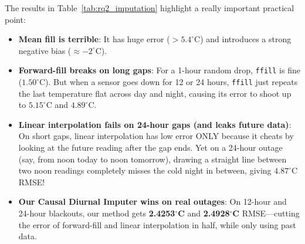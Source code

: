 \documentclass[conference]{IEEEtran}
\begin{document}
The results in Table~\ref{tab:rq2_imputation} highlight a really important practical point:
\begin{itemize}
    \item \textbf{Mean fill is terrible}: It has huge error ($>5.4^\circ\text{C}$) and introduces a strong negative bias ($\approx -2^\circ\text{C}$).
    \item \textbf{Forward-fill breaks on long gaps}: For a 1-hour random drop, \texttt{ffill} is fine ($1.50^\circ\text{C}$). But when a sensor goes down for 12 or 24 hours, \texttt{ffill} just repeats the last temperature flat across day and night, causing its error to shoot up to $5.15^\circ\text{C}$ and $4.89^\circ\text{C}$.
    \item \textbf{Linear interpolation fails on 24-hour gaps (and leaks future data)}: On short gaps, linear interpolation has low error ONLY because it cheats by looking at the future reading after the gap ends. Yet on a 24-hour outage (say, from noon today to noon tomorrow), drawing a straight line between two noon readings completely misses the cold night in between, giving $4.87^\circ\text{C}$ RMSE!
    \item \textbf{Our Causal Diurnal Imputer wins on real outages}: On 12-hour and 24-hour blackouts, our method gets \textbf{2.4253$^\circ$C} and \textbf{2.4928$^\circ$C} RMSE---cutting the error of forward-fill and linear interpolation in half, while only using past data.
\end{itemize}
\end{document}
